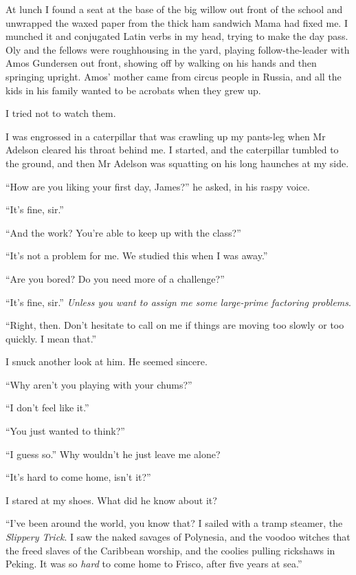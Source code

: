 At lunch I found a seat at the base of the big willow out front of
the school and unwrapped the waxed paper from the thick ham
sandwich Mama had fixed me. I munched it and conjugated Latin verbs
in my head, trying to make the day pass. Oly and the fellows were
roughhousing in the yard, playing follow-the-leader with Amos
Gundersen out front, showing off by walking on his hands and then
springing upright. Amos' mother came from circus people in Russia,
and all the kids in his family wanted to be acrobats when they grew
up.

I tried not to watch them.

I was engrossed in a caterpillar that was crawling up my pants-leg
when Mr Adelson cleared his throat behind me. I started, and the
caterpillar tumbled to the ground, and then Mr Adelson was
squatting on his long haunches at my side.

``How are you liking your first day, James?'' he asked, in his
raspy voice.

``It's fine, sir.''

``And the work? You're able to keep up with the class?''

``It's not a problem for me. We studied this when I was away.''

``Are you bored? Do you need more of a challenge?''

``It's fine, sir.''
\emph{Unless you want to assign me some large-prime factoring problems}.

``Right, then. Don't hesitate to call on me if things are moving too slowly or 
too quickly. I mean that.''

I snuck another look at him. He seemed sincere.

``Why aren't you playing with your chums?''

``I don't feel like it.''

``You just wanted to think?''

``I guess so.'' Why wouldn't he just leave me alone?

``It's hard to come home, isn't it?''

I stared at my shoes. What did he know about it?

``I've been around the world, you know that? I sailed with a tramp steamer, the 
\emph{Slippery Trick}. I saw the naked savages of Polynesia, and the voodoo 
witches that the freed slaves of the Caribbean worship, and the coolies pulling 
rickshaws in Peking. It was so \emph{hard} to come home to Frisco, after five 
years at sea.''

